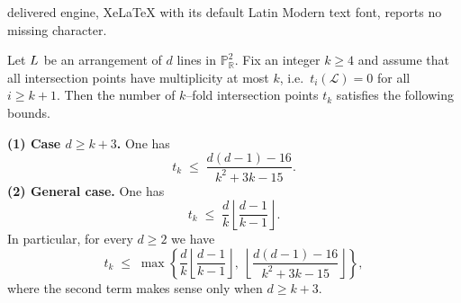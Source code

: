 \documentclass[10pt,a4paper]{amsart}
\newcommand{\LL}{\mathcal{L}}
\newcommand{\R}{\mathbb{R}}
\begin{document}
delivered engine, XeLaTeX with its default Latin Modern text font, reports no missing character.
\begin{lemma}\label{thm:tk_global_bound}
Let $\mathcal \LL$ be an arrangement of $d$ lines in $\mathbb{P}^2_\R$.
Fix an integer $k\ge 4$ and assume that all intersection points have multiplicity at most $k$,
i.e.\ $t_i(\mathcal L)=0$ for all $i\ge k+1$. Then the number of $k$--fold
intersection points $t_{k}$ satisfies the following bounds.

\smallskip
\noindent\textbf{(1) Case $d\ge  k+3$.} One has
\[
t_k \;\le\; \frac{d(d-1)-16}{k^2+3k-15}.
\]
\smallskip
\noindent\textbf{(2) General case.} One has
\[
t_k \;\le\; \frac{d}{k}\left\lfloor\frac{d-1}{k-1}\right\rfloor .
\]
\smallskip
In particular, for every $d\ge 2$ we have
\[
t_k \;\le\;
\max\!\left\{
\frac{d}{k}\left\lfloor\frac{d-1}{k-1}\right\rfloor,\;
\left\lfloor\frac{d(d-1)-16}{k^2+3k-15}\right\rfloor
\right\},
\]
where the second term makes sense only when $d\ge k+3$.
\end{lemma}
\end{document}
